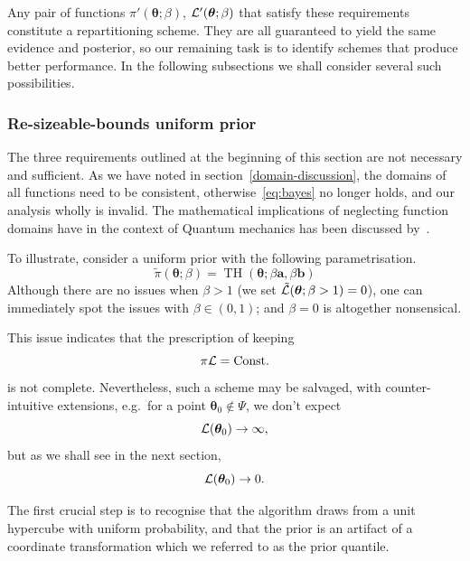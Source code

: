 \documentclass[usenatbib]{mnras}
\DeclareMathOperator{\TopHat}{TH}
\begin{document}
Any pair of functions \(\pi'(\bm{\theta}; \beta)\),
\({\cal L}'(\bm{\theta}; \beta)\) that satisfy these requirements
constitute a repartitioning scheme. They are all guaranteed to yield
the same evidence and posterior, so our remaining task is to identify
schemes that produce better performance. In the following subsections
we shall consider several such possibilities.

\subsubsection{Re-sizeable-bounds uniform prior}\label{sec:orga67f872}

The three requirements outlined at the beginning of this section are
not necessary and sufficient. As we have noted in
section~\vref{domain-discussion}, the domains of all functions need to
be consistent, otherwise~\vref{eq:bayes} no longer holds, and our
analysis wholly is invalid. The mathematical implications of
neglecting function domains have in the context of Quantum mechanics
has been discussed by~\cite{Gieres_2000}.

To illustrate, consider a uniform prior with the following
parametrisation.
\begin{equation}
  \tilde{\pi}(\bm{\theta}; \beta) = \TopHat(\bm{\theta}; \beta \bm{a}, \beta \bm{b})
\end{equation}
Although there are no issues when \(\beta>1\) (we set
\({\cal\tilde{L}}(\bm{\theta}; \beta>1)=0\)), one can immediately
spot the issues with \(\beta \in (0,1)\); and \(\beta=0\) is
altogether nonsensical.

This issue indicates that the prescription of keeping
\[\pi {\cal L} = \text{Const.}\] is not complete. Nevertheless, such a
scheme may be salvaged, with counter-intuitive extensions, e.g.~for a
point \(\bm{\theta}_{0} \notin \Psi\), we don't expect
\[{\cal L}(\bm{\theta}_{0}) \rightarrow \infty,\] but as we shall see in
the next section, \[{\cal L}(\bm{\theta}_{0}) \rightarrow 0.\]

The first crucial step is to recognise that the algorithm draws
from a unit hypercube with uniform probability, and that the prior
is an artifact of a coordinate transformation which we referred to
as the prior quantile.
\end{document}
